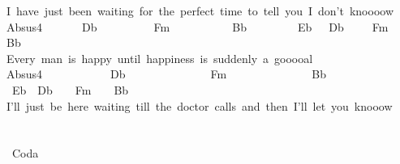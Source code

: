 {I\ have\ just\ been\ waiting\ for\ the\ perfect\ time\ to\ tell\ you\ I\ don't\ knoooow\\
Absus4\ \ \ \ \ \ \ Db\ \ \ \ \ \ \ \ \ \ Fm\ \ \ \ \ \ \ \ \ \ \ Bb\ \ \ \ \ \ \ \ \ Eb\ \ \ Db\ \ \ \ \ Fm\ \ \ \ Bb\\
Every\ man\ is\ happy\ until\ happiness\ is\ suddenly\ a\ gooooal\\
Absus4\ \ \ \ \ \ \ \ \ \ \ \ Db\ \ \ \ \ \ \ \ \ \ \ \ \ \ \ Fm\ \ \ \ \ \ \ \ \ \ \ \ \ \ \ Bb\ \ \ \ \ \ \ \ \ \ \ \ \ \ \ \ Eb\ \ Db\ \ \ \ Fm\ \ \ \ Bb\\
I'll\ just\ be\ here\ waiting\ till\ the\ doctor\ calls\ and\ then\ I'll\ let\ you\ knooow\\
\\
\\
\lbrack\ Coda\rbrack\ }

